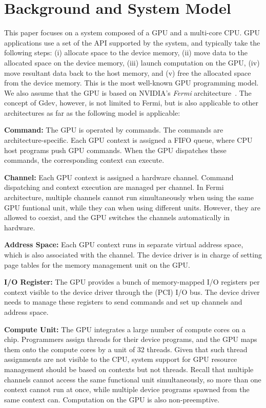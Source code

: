 \section{Background and System Model}
\label{sec:model}

This paper focuses on a system composed of a GPU and a multi-core CPU.
GPU applications use a set of the API supported by the system, and
typically take the following steps:
(i) allocate space to the device memory, 
(ii) move data to the allocated space on the device memory, 
(iii) launch computation on the GPU, 
(iv) move resultant data back to the host memory, and 
(v) free the allocated space from the device memory.
This is the most well-known GPU programming model.
We also assume that the GPU is based on NVIDIA's \textit{Fermi}
architecture~\cite{Fermi}.
The concept of Gdev, however, is not limited to Fermi, but is also
applicable to other architectures as far as the following model is
applicable: 

\textbf{Command:}
The GPU is operated by commands.
The commands are architecture-specific.
Each GPU context is assigned a FIFO queue, where CPU host programs push
GPU commands.
When the GPU dispatches these commands, the corresponding context can
execute. 

\textbf{Channel:}
Each GPU context is assigned a hardware channel.
Command dispatching and context execution are managed per channel.
In Fermi architecture, multiple channels cannot run simultaneously when
using the same GPU funtional unit, while they can when using different
units.
However, they are allowed to coexist, and the GPU switches the channels
automatically in hardware.

\textbf{Address Space:}
Each GPU context runs in separate virtual address space, which is also
associated with the channel.
The device driver is in charge of setting page tables for the memory
management unit on the GPU.

\textbf{I/O Register:}
The GPU provides a bunch of memory-mapped I/O registers per context
visible to the device driver through the (PCI) I/O bus.
The device driver needs to manage these registers to send commands and
set up channels and address space.

\textbf{Compute Unit:}
The GPU integrates a large number of compute cores on a chip.
Programmers assign threads for their device programs, and the GPU maps
them onto the compute cores by a unit of 32 threads.
Given that such thread assignments are not visible to the CPU, system
support for GPU resource management should be based on contexts but not
threads.
Recall that multiple channels cannot access the same functional unit
simultaneously, so more than one context cannot run at once, while
multiple device programs spawned from the same context can.
Computation on the GPU is also non-preemptive.

